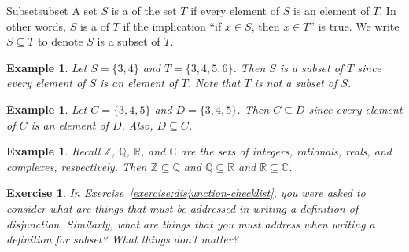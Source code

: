 \documentclass{book}
\newcounter{ekcounter}%
\theoremstyle{ekimcustom}
\newtheorem{example}[ekcounter]{Example}
\newtheorem{exercise}[ekcounter]{Exercise}
\newcommand\defn[1]{{\color{blue}{\bf #1}}}
\begin{document}
\begin{bdefinition}{Subset}{subset}
A set $S$ is a \defn{subset} of the set $T$ if every element of $S$ is an element of $T$. In other words, $S$ is a \defn{subset} of $T$ if the implication ``if $x \in S$, then $x \in T$'' is true. We write $S \subseteq T$ to denote $S$ is a subset of $T$.
\end{bdefinition}
\begin{example}
Let $S = \{3,4\}$ and $T = \{3,4,5,6\}$. Then $S$ is a subset of $T$ since every element of $S$ is an element of $T$. Note that $T$ is not a subset of $S$.
\end{example}
\begin{example}
Let $C = \{3,4,5\}$ and $D = \{3,4,5\}$. Then $C \subseteq D$ since every element of $C$ is an element of $D$. Also, $D \subseteq C$.
\end{example}
\begin{example}\label{example:number-set-subsets}
Recall $\mathbb{Z}$, $\mathbb{Q}$, $\mathbb{R}$, and $\mathbb{C}$ are the sets of integers, rationals, reals, and complexes, respectively. Then
$\mathbb{Z} \subseteq \mathbb{Q}$ and
$\mathbb{Q} \subseteq \mathbb{R}$ and
$\mathbb{R} \subseteq \mathbb{C}$.
\end{example}

\begin{exercise}
In Exercise~\ref{exercise:disjunction-checklist}, you were asked to consider what are things that must be addressed in writing a definition of disjunction. Similarly, what are things that you must address when writing a definition for subset? What things \emph{don't} matter?
\end{exercise}
\end{document}
